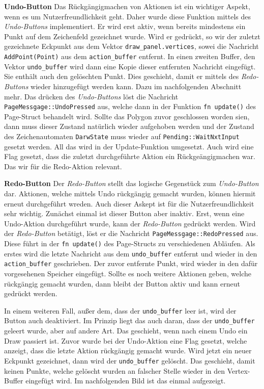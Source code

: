 \textbf{\small{Undo-Button}}\linebreak
Das Rückgängigmachen von Aktionen ist ein wichtiger Aspekt, wenn es um Nutzerfreundlichkeit geht. Daher wurde diese Funktion mittels des \emph{Undo-Buttons} implementiert.
Er wird erst aktiv, wenn bereits mindestens ein Punkt auf dem Zeichenfeld gezeichnet wurde. Wird er gedrückt, so wir der zuletzt gezeichnete Eckpunkt aus dem Vektor \lstinline{draw_panel.vertices}, sowei die Nachricht \lstinline{AddPoint(Point)}
aus dem \lstinline{action_buffer} entfernt. In einen zweiten Buffer, den Vektor \lstinline{undo_buffer} wird dann eine Kopie dieser entfernten Nachricht eingefügt. Sie enthält auch den gelöschten Punkt.
Dies geschieht, damit er mittels des \emph{Redo-Buttons} wieder hinzugefügt werden kann. Dazu im nachfolgenden Abschnitt mehr. Das drücken des \emph{Undo-Buttons} löst die Nachricht 
\lstinline{PageMessgage::UndoPressed} aus, welche dann in der Funktion \lstinline{fn update()} des Page-Struct behandelt wird. Sollte das Polygon zuvor geschlossen worden sien, dann muss dieser Zustand natürlich wieder aufgehoben werden und der Zustand 
des Zeichenautomaten \lstinline{DarwState} muss wieder auf \lstinline{Pending::WaitNxtInput} gesetzt werden. All das wird in der Update-Funktion umgesetzt. Auch wird eine Flag gesetzt, dass die zuletzt durchgeführte Aktion ein Rückgeängigmachen war. Das wir 
für die Redo-Aktion relevant.\linebreak

\textbf{\small{Redo-Button}}\linebreak
Der \emph{Redo-Button} stellt das logische Gegenstück zum \emph{Undo-Button} dar. Aktionen, welche mittels Undo rückgängig gemacht wurden, können hiermit erneut durchgeführt wreden. Auch dieser Askept ist für die Nutzerfreundlichkeit sehr wichtig.
Zunächst einmal ist dieser Button aber inaktiv. Erst, wenn eine Undo-Aktion durchgeführt wurde, kann der \emph{Redo-Button} gedrückt werden.
Wird der \emph{Redo-Button} betätigt, löst er die Nachricht \lstinline{PageMessgage::RedoPressed} aus. Diese führt in der \lstinline{fn update()} des Page-Structs zu verschiedenen Abläufen.
Als erstes wird die letzte Nachricht aus dem \lstinline{undo_buffer} entfernt und wieder in den \lstinline{action_buffer} geschrieben. Der zuvor entfernte Punkt, wird wieder in den dafür vorgesehenen Speicher eingefügt.
Sollte es noch weitere Aktionen geben, welche rückgängig gemacht wurden, dann bleibt der Button aktiv und kann erneut gedrückt werden.

In einem weiteren Fall, außer dem, dass der \lstinline{undo_buffer} leer ist, wird der Button auch deaktiviert. Im Prinzip liegt das auch daran, dass der \lstinline{undo_buffer} geleert wurde, aber auf andere Art.
Das geschieht, wenn nach einem Undo ein Draw passiert ist. Zuvor wurde bei der Undo-Aktion eine Flag gesetzt, welche anzeigt, dass die letzte Aktion rückgängig gemacht wurde. Wird jetzt ein neuer Eckpunkt gezeichnet, 
dann wird der \lstinline{undo_buffer} gelöscht. Das geschieht, damit keinen Punkte, welche gelöscht wurden an falscher Stelle wieder in den Vertex-Buffer eingefügt wird. Im nachfolgenden Bild ist das einmal aufgezeigt.
\linebreak

